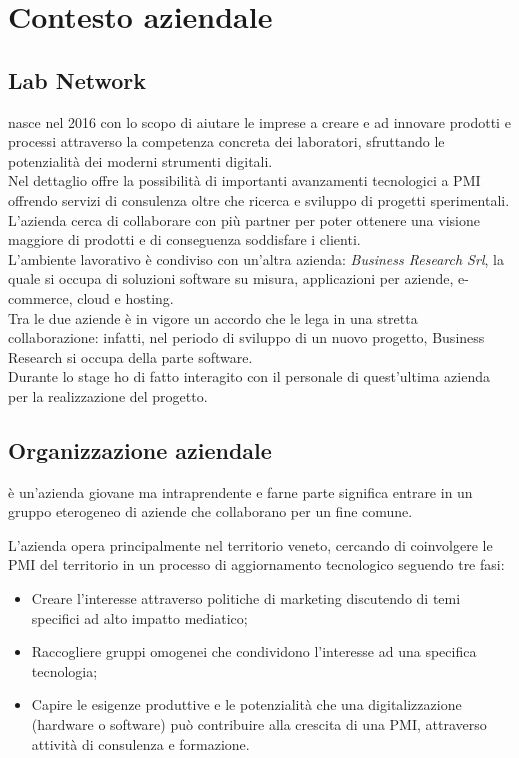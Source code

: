 
\chapter{Contesto aziendale}
\label{cap:introduzione}

\section{Lab Network}
\lab{} nasce nel 2016 con lo scopo di aiutare le imprese a creare e ad innovare prodotti e processi attraverso la competenza concreta dei laboratori, sfruttando le potenzialità dei moderni strumenti digitali.\\
Nel dettaglio \lab{} offre la possibilità di importanti avanzamenti tecnologici a PMI offrendo servizi di consulenza oltre che ricerca e sviluppo di progetti sperimentali.\\
L'azienda cerca di collaborare con più partner per poter ottenere una visione maggiore di prodotti e di conseguenza soddisfare i clienti.\\
L'ambiente lavorativo è condiviso con un'altra azienda: \textit{Business Research Srl}, la quale si occupa di soluzioni software su misura, applicazioni per aziende, e-commerce, cloud e hosting.\\
Tra le due aziende è in vigore un accordo che le lega in una stretta collaborazione: infatti, nel periodo di sviluppo di un nuovo progetto, Business Research si occupa della parte software.\\
Durante lo stage ho di fatto interagito con il personale di quest'ultima azienda per la realizzazione del progetto.

\section{Organizzazione aziendale}
\lab{} è un'azienda giovane ma intraprendente e farne parte significa entrare in un gruppo eterogeneo di aziende che collaborano per un fine comune.

\noindent L'azienda opera principalmente nel territorio veneto, cercando di coinvolgere le PMI del territorio in un processo di aggiornamento tecnologico seguendo tre fasi:
\begin{itemize}
\item Creare l'interesse attraverso politiche di marketing discutendo di temi specifici ad alto impatto mediatico;
\item Raccogliere gruppi omogenei che condividono l'interesse ad una specifica tecnologia;
\item Capire le esigenze produttive e le potenzialità che una digitalizzazione (hardware o software) può contribuire alla crescita di una PMI, attraverso attività di consulenza e formazione.
\end{itemize}

